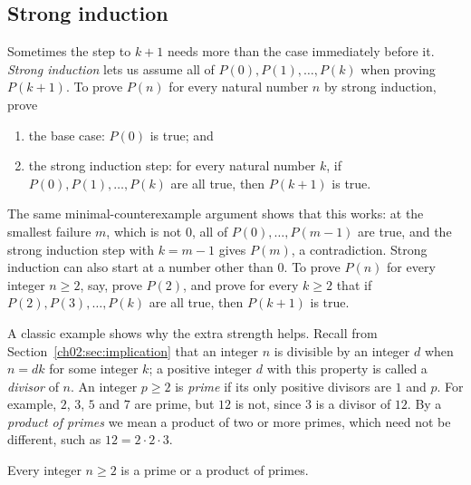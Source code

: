 \subsection*{Strong induction}
Sometimes the step to $k+1$ needs more than the case immediately before it. \emph{Strong induction} lets us assume all of $P(0),P(1),\ldots,P(k)$ when proving $P(k+1)$. To prove $P(n)$ for every natural number $n$ by strong induction, prove
\begin{enumerate}
\item the base case: $P(0)$ is true; and
\item the strong induction step: for every natural number $k$, if $P(0),P(1),\ldots,P(k)$ are all true, then $P(k+1)$ is true.
\end{enumerate}
The same minimal-counterexample argument shows that this works: at the smallest failure $m$, which is not $0$, all of $P(0),\ldots,P(m-1)$ are true, and the strong induction step with $k=m-1$ gives $P(m)$, a contradiction. Strong induction can also start at a number other than $0$. To prove $P(n)$ for every integer $n\ge2$, say, prove $P(2)$, and prove for every $k\ge2$ that if $P(2),P(3),\ldots,P(k)$ are all true, then $P(k+1)$ is true.

A classic example shows why the extra strength helps. Recall from Section~\ref{ch02:sec:implication} that an integer $n$ is divisible by an integer $d$ when $n=dk$ for some integer $k$; a positive integer $d$ with this property is called a \emph{divisor} of $n$. An integer $p\ge2$ is \emph{prime} if its only positive divisors are $1$ and $p$. For example, $2$, $3$, $5$ and $7$ are prime, but $12$ is not, since $3$ is a divisor of $12$. By a \emph{product of primes} we mean a product of two or more primes, which need not be different, such as $12=2\cdot2\cdot3$.

\begin{proposition}\label{ch05:prop:prime-product}
Every integer $n\ge2$ is a prime or a product of primes.
\end{proposition}

